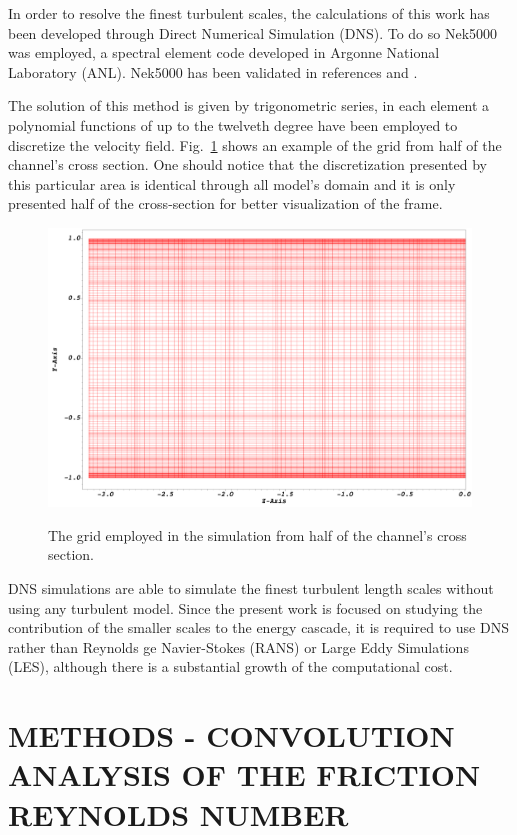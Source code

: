 \documentclass[twocolumn,10pt]{asme2e}
\begin{document}
In order to resolve the finest turbulent scales, the calculations of this work has been developed through Direct Numerical Simulation (DNS). To do so Nek5000 was employed, a spectral element code developed in Argonne National Laboratory (ANL). Nek5000 has been validated in references \cite{merzari2013} and \cite{Obabko2011}.

The solution of this method is given by trigonometric series, in each element a polynomial functions of up to the twelveth degree have been employed to discretize the velocity field. Fig.~\ref{fig:mesh} shows an example of the grid from half of the channel's cross section. One should notice that the discretization presented by this particular area is identical through all model's domain and it is only presented half of the cross-section for better visualization of the frame.

\begin{figure}[t]
	\centering
	\scalebox{0.16}
	{\includegraphics{mesh.png}}
	\caption{The grid employed in the simulation from half of the channel's cross section.}
	\label{fig:mesh}
\end{figure}

DNS simulations are able to simulate the finest turbulent length scales without using any turbulent model. Since the present work is focused on studying the contribution of the smaller scales to the energy cascade, it is required to use DNS rather than Reynolds 
ge Navier-Stokes (RANS) or Large Eddy Simulations (LES), although there is a substantial growth of the computational cost.

\section*{METHODS - CONVOLUTION ANALYSIS OF THE FRICTION REYNOLDS NUMBER}
\end{document}
